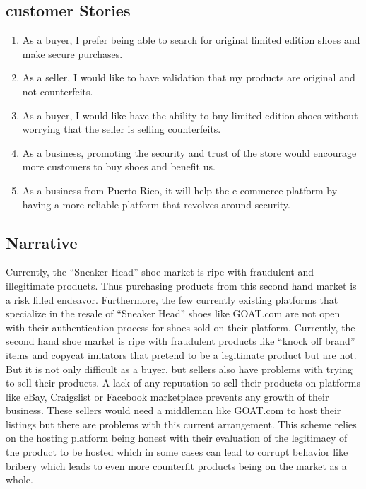 \subsection{customer Stories}
\begin{enumerate}
  \item As a buyer, I prefer being able to search for original limited edition shoes and make secure purchases.
  \item As a seller, I would like to have validation that my products are original and not counterfeits.
  \item As a buyer, I would like have the ability to buy limited edition shoes without worrying that the seller is selling counterfeits.
  \item As a business, promoting the security and trust of the store would encourage more customers to buy shoes and benefit us.
  \item As a business from Puerto Rico, it will help the e-commerce platform by having a more reliable platform that revolves around security.
\end{enumerate}
\subsection{Narrative}
\hspace{1cm} Currently, the ``Sneaker Head'' shoe market is ripe with fraudulent and illegitimate products. Thus purchasing products from this second hand market is a risk filled endeavor. Furthermore, the few currently existing platforms that specialize in the resale of ``Sneaker Head'' shoes like GOAT.com are not open with their authentication process for shoes sold on their platform. Currently, the second hand shoe market is ripe with fraudulent products like ``knock off brand'' items and copycat imitators that pretend to be a legitimate product but are not. But it is not only difficult as a buyer, but sellers also have problems with trying to sell their products. A lack of any reputation to sell their products on platforms like eBay, Craigslist or Facebook marketplace prevents any growth of their business. These sellers would need a middleman like GOAT.com to host their listings but there are problems with this current arrangement. This scheme relies on the hosting platform being honest with their evaluation of the legitimacy of the product to be hosted which in some cases can lead to corrupt behavior like bribery which leads to even more counterfit products being on the market as a whole.
